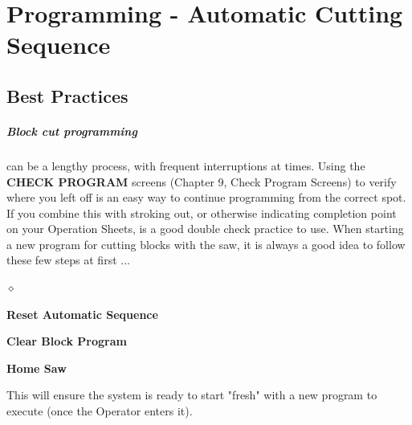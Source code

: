 \chapter{Programming - Automatic Cutting Sequence}
\section{Best Practices}\paragraph*{Block cut programming}can be a lengthy process, with frequent interruptions at times. Using the \textbf{CHECK PROGRAM} screens (Chapter 9, Check Program Screens) to verify where you left off is an easy way to continue programming from the correct spot. If you combine this with stroking out, or otherwise indicating completion point on your Operation Sheets, is a good double check practice to use. When starting a new program for cutting blocks with the saw, it is always a good idea to follow these few steps at first ...
\begin{list}{$\diamond$}{}
	\item \textbf{Reset Automatic Sequence}
	\item \textbf{Clear Block Program}
	\item \textbf{Home Saw}
\end{list}
This will ensure the system is ready to start "fresh" with a new program to execute (once the Operator enters it). 

